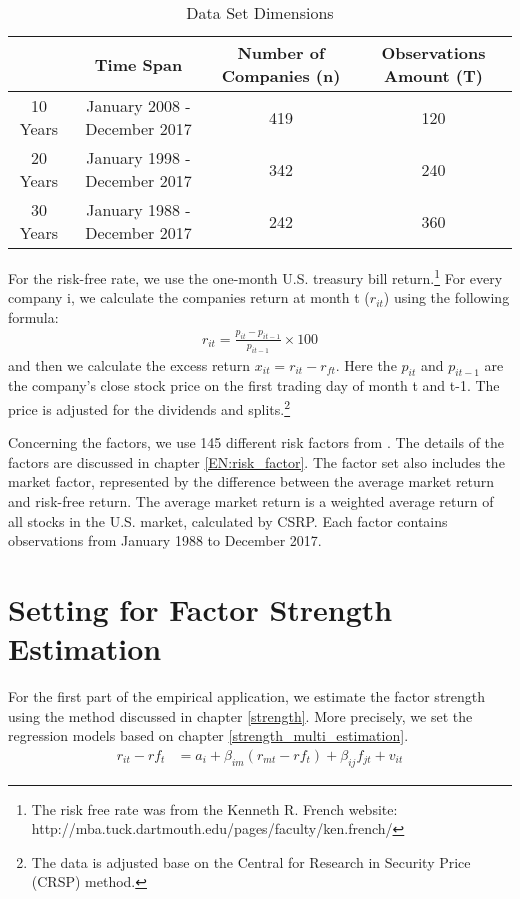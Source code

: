 \begin{table}[H]
	\centering
		\caption{Data Set Dimensions}
			\label{Data_set}
	\begin{tabular}{c|ccc}
		\hline
		& Time Span                    & Number of Companies (n) & Observations Amount (T) \\ \hline
		10 Years & January 2008 - December 2017 & 419                  & 120                     \\
		20 Years & January 1998 - December 2017 & 342                  & 240                     \\
		30 Years & January 1988 - December 2017 & 242                  & 360                     \\ \hline
	\end{tabular}
\end{table}
For the risk-free rate, we use the one-month U.S. treasury bill return.\footnote{ The risk free rate was from the Kenneth R. French website: http://mba.tuck.dartmouth.edu/pages/faculty/ken.french/}
For every company i, we calculate the companies return at month t ($r_{it}$) using the following formula:
\begin{align*}
r_{it} = \frac{p_{i t} - p_{i t-1}}{p_{i t-1}}\times 100
\end{align*}
and then we calculate the excess return $x_{it} = r_{it} - r_{ft}$.
Here the $p_{it}$ and $p_{i t-1}$ are the company's close stock price on the first trading day of month t and t-1.
The price is adjusted for the dividends and splits.\footnote{The data is adjusted base on the Central for Research in Security Price (CRSP) method.}

Concerning the factors, we use 145 different risk factors from .
The details of the factors are discussed in chapter \ref{EN:risk_factor}.
The factor set also includes the market factor, represented by the difference between the average market return and risk-free return.
The average market return is a weighted average return of all stocks in the U.S. market, calculated by CSRP.
Each factor contains observations from January 1988 to December 2017.

\section{Setting for Factor Strength Estimation}
For the first part of the empirical application, we estimate the factor strength using the method discussed in chapter \ref{strength}.
More precisely, we set the regression models based on chapter \ref{strength_multi_estimation}.
\begin{align*}
r_{it} - rf_{t} &= a_i + \beta_{im}(r_{mt} - rf_{t}) + \beta_{ij}f_{jt} + v_{it} 
\end{align*}

